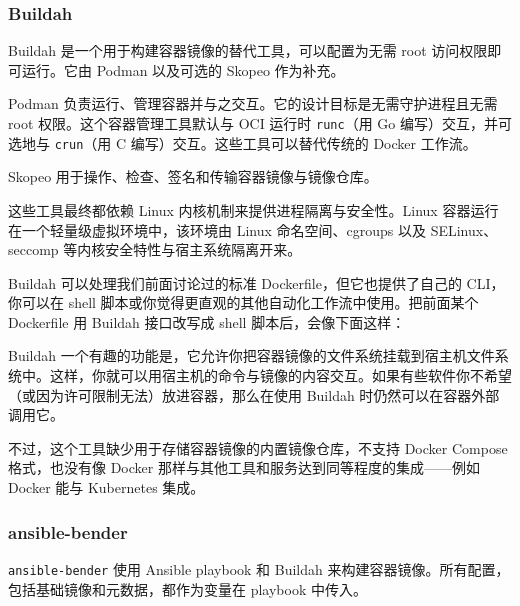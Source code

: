 \subsubsection{Buildah}

\label{idx:1767}
\label{idx:1768}
Buildah 是一个用于构建容器镜像的替代工具，可以配置为无需 root 访问权限即可运行。它由 Podman 以及可选的 Skopeo 作为补充。

Podman 负责运行、管理容器并与之交互。它的设计目标是无需守护进程且无需 root 权限。这个容器管理工具默认与 OCI 运行时 \texttt{runc}（用 Go 编写）交互，并可选地与 \texttt{crun}（用 C 编写）交互。这些工具可以替代传统的 Docker 工作流。

Skopeo 用于操作、检查、签名和传输容器镜像与镜像仓库。

\label{idx:1769}
\label{idx:1770}
这些工具最终都依赖 Linux 内核机制来提供进程隔离与安全性。Linux 容器运行在一个轻量级虚拟环境中，该环境由 Linux 命名空间、cgroups 以及 SELinux、seccomp 等内核安全特性与宿主系统隔离开来。


\label{idx:1771}
Buildah 可以处理我们前面讨论过的标准 Dockerfile，但它也提供了自己的 CLI，你可以在 shell 脚本或你觉得更直观的其他自动化工作流中使用。把前面某个 Dockerfile 用 Buildah 接口改写成 shell 脚本后，会像下面这样：


\label{idx:1772}
Buildah 一个有趣的功能是，它允许你把容器镜像的文件系统挂载到宿主机文件系统中。这样，你就可以用宿主机的命令与镜像的内容交互。如果有些软件你不希望（或因为许可限制无法）放进容器，那么在使用 Buildah 时仍然可以在容器外部调用它。

\label{idx:1773}
\label{idx:1774}
不过，这个工具缺少用于存储容器镜像的内置镜像仓库，不支持 Docker Compose 格式，也没有像 Docker 那样与其他工具和服务达到同等程度的集成——例如 Docker 能与 Kubernetes 集成。

\subsubsection{ansible-bender}

\label{idx:1775}
\label{idx:1776}
\texttt{ansible-bender} 使用 Ansible playbook 和 Buildah 来构建容器镜像。所有配置，包括基础镜像和元数据，都作为变量在 playbook 中传入。

